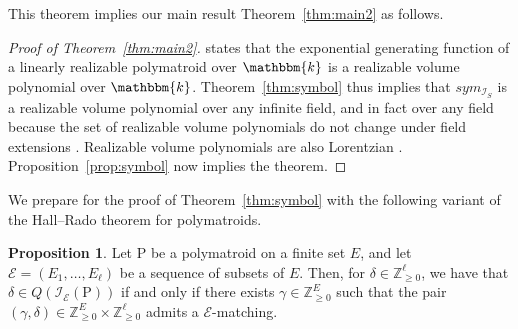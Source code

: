\documentclass{amsart}
\newcommand{\ZZ}{\mathbb Z}
\newcommand{\kk}{\mathbbm{k}}
\renewcommand{\P}{\mathrm{P}}
\theoremstyle{plain}
\theoremstyle{definition}
\newtheorem{prop}[thm]{Proposition}
\begin{document}
This theorem implies our main result Theorem~\ref{thm:main2} as follows.

\begin{proof}[Proof of Theorem~\ref{thm:main2}]
\cite[Corollary~1.4 \& Remark~3.21]{EL2024intersection} states that the exponential generating function of a linearly realizable polymatroid over $\kk$ is a realizable volume polynomial over $\kk$.
Theorem~\ref{thm:symbol} thus implies that $sym_{\mathcal I_S}$ is a realizable volume polynomial over any infinite field, and in fact over any field because the set of realizable volume polynomials do not change under field extensions \cite[Proposition 2.10]{GHMSW2025volpres}.  Realizable volume polynomials are also Lorentzian \cite[Theorem~4.6]{BH20}.  Proposition~\ref{prop:symbol} now implies the theorem.
\end{proof}

We prepare for the proof of Theorem~\ref{thm:symbol} with the following variant of the Hall--Rado theorem for polymatroids.

\begin{prop}\label{prop:HR}\cite[Theorem 2]{McD75}
Let $\P$ be a polymatroid on a finite set $E$, and let $\mathcal E = (E_1, \dotsc, E_\ell)$ be a sequence of subsets of $E$.
Then, for $\delta \in \ZZ_{\geq 0}^\ell$, we have that $\delta \in Q(\mathcal I_{\mathcal E}(\P))$ if and only if there exists $\gamma\in \ZZ_{\geq 0}^E$ such that the pair $(\gamma,\delta) \in \ZZ_{\geq 0}^E \times \ZZ_{\geq 0}^\ell$ admits a $\mathcal E$-matching.
\end{prop}
\end{document}
